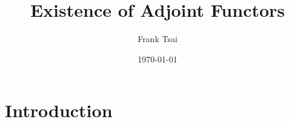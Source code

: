 \documentclass{amsart}
\title{Existence of Adjoint Functors}
\author{Frank Tsai}
\date{\today}
\begin{document}
\maketitle
\tableofcontents

\section{Introduction}
\label{sec:introduction}




\end{document}
